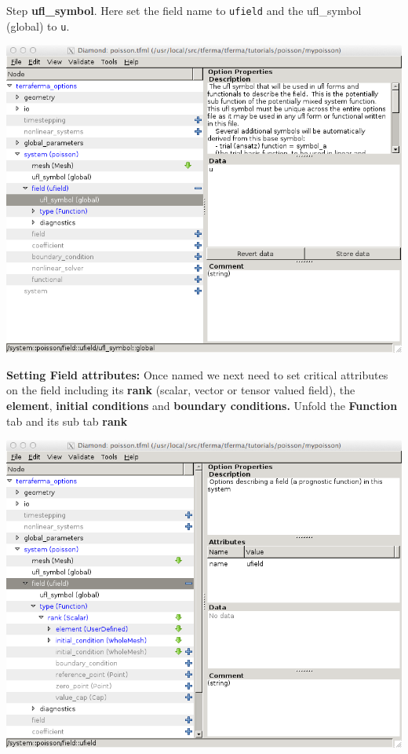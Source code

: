 \begin{steps}{Step}
\textbf{ufl\_symbol}.  Here set the field name to \texttt{ufield} and
the ufl\_symbol (global) to \texttt{u}.
\begin{center}
    \includegraphics[width=\diamondwidth]{figures/screendumps/diamond_poisson_06c.png}
\end{center}
\item \textbf{Setting Field attributes:} Once named we next need to
  set critical attributes on the field including its \textbf{rank}
  (scalar, vector or tensor valued field), the \textbf{element},
  \textbf{initial conditions} and \textbf{boundary conditions.} Unfold
  the \textbf{Function} tab and its sub tab \textbf{rank}
\begin{center}
    \includegraphics[width=\diamondwidth]{figures/screendumps/diamond_poisson_07a.png}

\end{center}
\end{steps}
